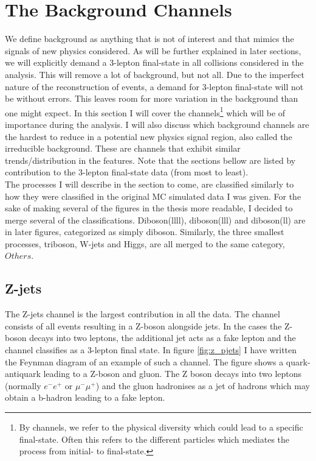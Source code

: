 \section{The Background Channels}\label{sec:bkg}
We define background as anything that is not of interest and that mimics the signals of new physics considered. 
As will be further explained in  later sections, we will explicitly demand a 3-lepton final-state in all collisions 
considered in the analysis. This will remove a lot of background, but not all. Due to the imperfect nature of the 
reconstruction of events, a demand for 3-lepton final-state will not be without errors. This leaves room for more 
variation in the background than one might expect. In this section I will cover the channels\footnote{By channels,
we refer to the physical diversity which could lead to a specific final-state. Often this refers to 
the different particles which mediates the process from initial- to final-state.} which will 
be of importance during the analysis. I will also discuss which background channels are the hardest 
to reduce in a potential new physics signal region, also called the irreducible background. These are 
channels that exhibit similar trends/distribution in the features. Note that the sections bellow
are listed by contribution to the 3-lepton final-state data (from most to least).  
\\
The processes I will describe in the section to come, are classified similarly to how they were classified in the original 
\ac{MC} simulated data I was given. For the sake of making several of the figures in the thesis more readable, I decided 
to merge several of the classifications. Diboson(llll), diboson(lll) and diboson(ll) are in later figures, categorized as 
simply diboson. Similarly, the three smallest processes, triboson, W-jets and Higgs, are all merged to the same category, $Others$.
\subsection{Z-jets}
The Z-jets channel is the largest contribution in all the data. The channel consists of all events
resulting in a Z-boson alongside jets. In the cases the Z-boson decays into two leptons, the additional 
jet acts as a fake lepton and the channel classifies as a 3-lepton final state. In figure \ref{fig:z_pjets} 
I have written the Feynman diagram of an example of such a channel. The figure shows a quark-antiquark leading 
to a Z-boson and gluon. The Z boson decays into two leptons (normally 
$e^-e^+$ or $\mu^- \mu^+$) and the gluon hadronises as a jet of hadrons which may obtain a b-hadron leading to a 
fake lepton. 

